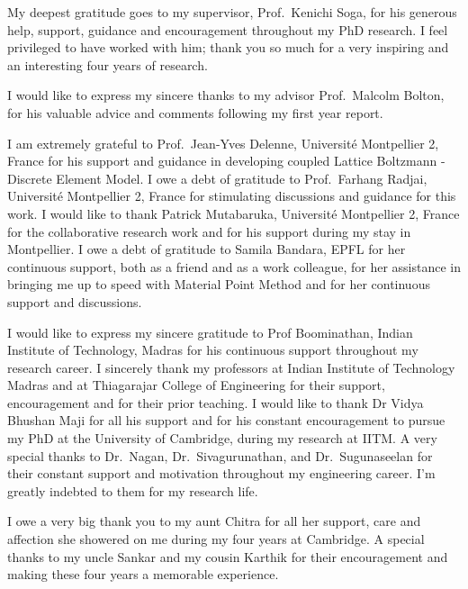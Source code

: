 
\begin{acknowledgements}      

My deepest gratitude goes to my supervisor, Prof.~Kenichi Soga, for his 
generous help, support, guidance and encouragement throughout my PhD research. 
I feel privileged to have worked with him; thank you so much for a very 
inspiring and an interesting four years of research. 

I would like to express my sincere thanks to my advisor Prof.~Malcolm Bolton, 
for his valuable advice and comments following my first year report.

I am extremely grateful to Prof.~Jean-Yves Delenne, Universit\'{e} Montpellier 
2, France for his support and guidance in developing coupled Lattice Boltzmann 
- Discrete Element Model. I owe a debt of gratitude to Prof.~Farhang Radjai, 
Universit\'{e} Montpellier 2, France for stimulating discussions and guidance 
for this work. I would like to thank Patrick Mutabaruka, Universit\'{e} 
Montpellier 2, France for the collaborative research work and for his support 
during my stay in Montpellier. I owe a debt of gratitude to Samila Bandara, 
EPFL for her continuous support, both as a friend and as a work colleague, for 
her assistance in bringing me up to speed with Material Point Method and for 
her continuous support and discussions.

I would like to express my sincere gratitude to Prof Boominathan, Indian 
Institute of Technology, Madras for his continuous support throughout my 
research career. I sincerely thank my professors at Indian Institute of 
Technology Madras and at Thiagarajar College of Engineering for their support, 
encouragement and for their prior teaching. I would like to thank Dr Vidya 
Bhushan Maji for all his support and for his constant encouragement to pursue 
my PhD at the University of Cambridge, during my research at IITM. A very 
special thanks to Dr.~Nagan, Dr.~Sivagurunathan, and Dr.~Sugunaseelan for their 
constant support and motivation throughout my engineering career. I'm greatly 
indebted to them for my research life.

I owe a very big thank you to my aunt Chitra for all her support, care and 
affection she showered on me during my four years at Cambridge. A special 
thanks to my uncle Sankar and my cousin Karthik for their encouragement and 
making these four years a memorable experience.


\end{acknowledgements}
